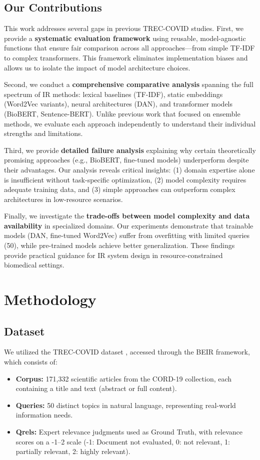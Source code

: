 \documentclass[sigconf,nonacm]{acmart}
\begin{document}
\subsection{Our Contributions}
This work addresses several gaps in previous TREC-COVID studies. First, we provide a \textbf{systematic evaluation framework} using reusable, model-agnostic functions that ensure fair comparison across all approaches—from simple TF-IDF to complex transformers. This framework eliminates implementation biases and allows us to isolate the impact of model architecture choices.

Second, we conduct a \textbf{comprehensive comparative analysis} spanning the full spectrum of IR methods: lexical baselines (TF-IDF), static embeddings (Word2Vec variants), neural architectures (DAN), and transformer models (BioBERT, Sentence-BERT). Unlike previous work that focused on ensemble methods, we evaluate each approach independently to understand their individual strengths and limitations.

Third, we provide \textbf{detailed failure analysis} explaining why certain theoretically promising approaches (e.g., BioBERT, fine-tuned models) underperform despite their advantages. Our analysis reveals critical insights: (1) domain expertise alone is insufficient without task-specific optimization, (2) model complexity requires adequate training data, and (3) simple approaches can outperform complex architectures in low-resource scenarios.

Finally, we investigate the \textbf{trade-offs between model complexity and data availability} in specialized domains. Our experiments demonstrate that trainable models (DAN, fine-tuned Word2Vec) suffer from overfitting with limited queries (50), while pre-trained models achieve better generalization. These findings provide practical guidance for IR system design in resource-constrained biomedical settings.

\section{Methodology}

\subsection{Dataset}
We utilized the TREC-COVID dataset \cite{thakur2021beir}, accessed through the BEIR framework, which consists of:
\begin{itemize}
    \item \textbf{Corpus:} 171,332 scientific articles from the CORD-19 collection, each containing a title and text (abstract or full content).
    \item \textbf{Queries:} 50 distinct topics in natural language, representing real-world information needs.
    \item \textbf{Qrels:} Expert relevance judgments used as Ground Truth, with relevance scores on a -1--2 scale (-1: Document not evaluated, 0: not relevant, 1: partially relevant, 2: highly relevant).
\end{itemize}
\end{document}
